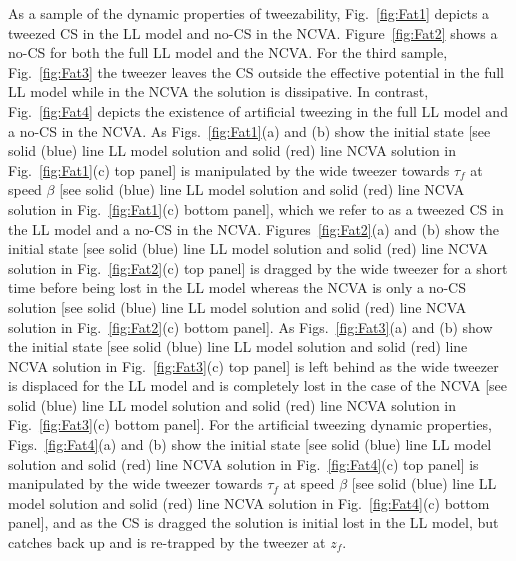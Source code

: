 As a sample of the dynamic properties of tweezability, Fig.~\ref{fig:Fat1} depicts a tweezed CS in the LL model and no-CS in the NCVA.  Figure~\ref{fig:Fat2} shows a no-CS for both the full LL model and the NCVA.  For the third sample, Fig.~\ref{fig:Fat3} the tweezer leaves the CS outside the effective potential in the full LL model while in the NCVA the solution is dissipative.  In contrast, Fig.~\ref{fig:Fat4} depicts the existence of artificial tweezing in the full LL model and a no-CS in the NCVA.  As Figs.~\ref{fig:Fat1}(a) and (b) show the initial state [see solid (blue) line LL model solution and solid (red) line NCVA solution in Fig.~\ref{fig:Fat1}(c) top panel] is manipulated by the wide tweezer towards $\tau_f$ at speed $\beta$ [see solid (blue) line LL model solution  and solid (red) line NCVA solution in Fig.~\ref{fig:Fat1}(c) bottom panel], which we refer to as a tweezed CS in the LL model and a no-CS in the NCVA.  Figures~\ref{fig:Fat2}(a) and (b) show the initial state [see solid (blue) line LL model solution and solid (red) line NCVA solution in Fig.~\ref{fig:Fat2}(c) top panel] is dragged by the wide tweezer for a short time before being lost in the LL model whereas the NCVA is only a no-CS solution [see solid (blue) line LL model solution and solid (red) line NCVA solution in Fig.~\ref{fig:Fat2}(c) bottom panel].  As Figs.~\ref{fig:Fat3}(a) and (b) show the initial state [see solid (blue) line LL model solution and solid (red) line NCVA solution in Fig.~\ref{fig:Fat3}(c) top panel] is left behind as the wide tweezer is displaced for the LL model and is completely lost in the case of the NCVA  [see solid (blue) line LL model solution  and solid (red) line NCVA solution in Fig.~\ref{fig:Fat3}(c) bottom panel].  For the artificial tweezing dynamic properties, Figs.~\ref{fig:Fat4}(a) and (b) show the initial state [see solid (blue) line LL model solution and solid (red) line NCVA solution in Fig.~\ref{fig:Fat4}(c) top panel] is manipulated by the wide tweezer towards $\tau_f$ at speed $\beta$ [see solid (blue) line LL model solution and solid (red) line NCVA solution in Fig.~\ref{fig:Fat4}(c) bottom panel], and as the CS is dragged the solution is initial lost in the LL model, but catches back up and is re-trapped by the tweezer at $z_f$. 

